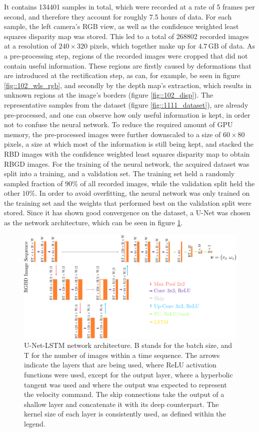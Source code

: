 It contains 134401 samples in total, which were recorded at a rate of 5 frames per second, and therefore they account for roughly 7.5 hours of data. For each sample, the left camera's RGB view, as well as the confidence weighted least squares disparity map was stored. This led to a total of 268802 recorded images at a resolution of $240\times320$ pixels, which together make up for $4.7\,\text{GB}$ of data. As a pre-processing step, regions of the recorded images were cropped that did not contain useful information. These regions are firstly caused by deformations that are introduced at the rectification step, as can, for example, be seen in figure \ref{fig::102_wls_rgb}, and secondly by the depth map's extraction, which results in unknown regions at the image's borders (figure \ref{fig::102_disp}). The representative samples from the dataset (figure \ref{fig::1111_dataset}), are already pre-processed, and one can observe how only useful information is kept, in order not to confuse the neural network. To reduce the required amount of GPU memory, the pre-processed images were further downscaled to a size of $60\times80$ pixels, a size at which most of the information is still being kept, and stacked the RBD images with the confidence weighted least squares disparity map to obtain RBGD images. For the training of the neural network, the acquired dataset was split into a training, and a validation set. The training set held a randomly sampled fraction of $90\%$ of all recorded images, while the validation split held the other $10\%$. In order to avoid overfitting, the neural network was only trained on the training set and the weights that performed best on the validation split were stored. Since it has shown good convergence on the dataset, a U-Net \cite{ronneberger2015u} was chosen as the network architecture, which can be seen in figure \ref{fig::1111_unet}.
\begin{figure}[h!]
	\centering
	\includegraphics[scale=.5]{chapters/11_autonomous_walking_experiments/img/unet.png}
	\caption{U-Net-LSTM network architecture. B stands for the batch size, and T for the number of images within a time sequence. The arrows indicate the layers that are being used, where ReLU activation functions were used, except for the output layer, where a hyperbolic tangent was used and where the output was expected to represent the velocity command. The skip connections take the output of a shallow layer and concatenate it with its deep counterpart. The kernel size of each layer is consistently used, as defined within the legend.}
	\label{fig::1111_unet}
\end{figure}
